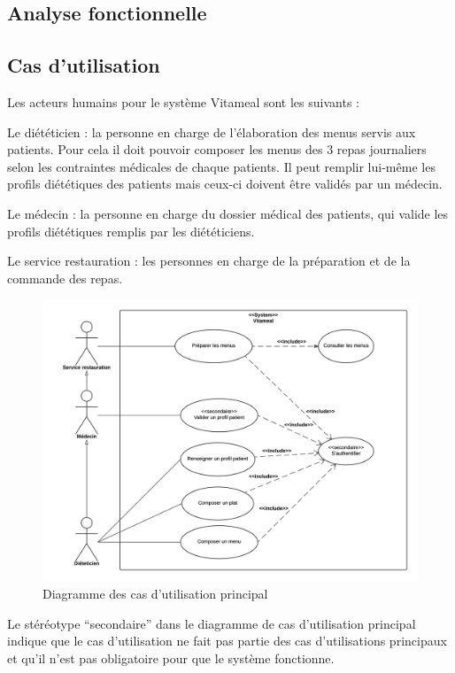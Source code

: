 \textcolor[RGB]{46, 116, 181}{\chapter{Analyse fonctionnelle}}

\section{Cas d'utilisation}

Les acteurs humains pour le système Vitameal sont les suivants :

Le diététicien : la personne en charge de l'élaboration des menus servis aux patients. Pour cela il doit pouvoir composer les menus des 3 repas journaliers selon les contraintes médicales de chaque patients. Il peut remplir lui-même les profils diététiques des patients mais ceux-ci doivent être validés par un médecin.

Le médecin : la personne en charge du dossier médical des patients, qui valide les profils diététiques remplis par les diététiciens.
 
Le service restauration : les personnes en charge de la préparation et de la commande des repas.

\begin{figure}[H]
\centering
\includegraphics[scale=0.8]{../../CasDUtilisations/diagramme_cas_utilisation.png}
\caption{Diagramme des cas d'utilisation principal}
\end{figure}

Le stéréotype ``secondaire'' dans le diagramme de cas d'utilisation principal indique que le cas d'utilisation ne fait pas partie des cas d'utilisations principaux et qu'il n'est pas obligatoire pour que le système fonctionne.

